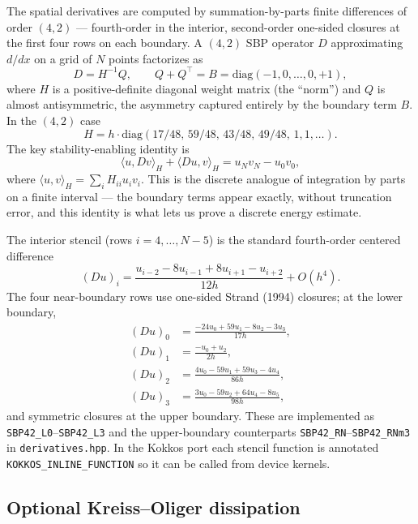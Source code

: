 \documentclass[11pt]{article}
\begin{document}
The spatial derivatives are computed by summation-by-parts
finite differences of order $(4,2)$ --- fourth-order in the
interior, second-order one-sided closures at the first four rows
on each boundary.  A $(4,2)$ SBP operator $D$ approximating
$d/dx$ on a grid of $N$ points factorizes as
\begin{equation}
  D = H^{-1} Q, \qquad
  Q + Q^\top = B = \mathrm{diag}(-1, 0, \ldots, 0, +1),
\end{equation}
where $H$ is a positive-definite diagonal weight matrix (the
``norm'') and $Q$ is almost antisymmetric, the asymmetry captured
entirely by the boundary term $B$.  In the $(4,2)$ case
\begin{equation}
  H = h \cdot \mathrm{diag}(17/48,\, 59/48,\, 43/48,\, 49/48,\,
                            1, 1, \ldots).
\end{equation}
The key stability-enabling identity is
\begin{equation}
  \langle u, D v \rangle_H + \langle Du, v \rangle_H
    = u_N v_N - u_0 v_0,
\end{equation}
where
$\langle u, v \rangle_H = \sum_i H_{ii} u_i v_i$.  This is the
discrete analogue of integration by parts on a finite interval ---
the boundary terms appear exactly, without truncation error, and
this identity is what lets us prove a discrete energy estimate.

The interior stencil (rows $i = 4, \ldots, N-5$) is the standard
fourth-order centered difference
\[
  (D u)_i = \frac{u_{i-2} - 8 u_{i-1} + 8 u_{i+1} - u_{i+2}}{12 h}
  + O(h^4).
\]
The four near-boundary rows use one-sided Strand (1994) closures;
at the lower boundary,
\begin{align*}
  (D u)_0 &= \frac{-24 u_0 + 59 u_1 - 8 u_2 - 3 u_3}{17 h}, \\
  (D u)_1 &= \frac{-u_0 + u_2}{2 h}, \\
  (D u)_2 &= \frac{ 4 u_0 - 59 u_1 + 59 u_3 - 4 u_4}{86 h}, \\
  (D u)_3 &= \frac{ 3 u_0 - 59 u_2 + 64 u_4 - 8 u_5}{98 h},
\end{align*}
and symmetric closures at the upper boundary.  These are
implemented as \texttt{SBP42\_L0}--\texttt{SBP42\_L3} and the
upper-boundary counterparts \texttt{SBP42\_RN}--\texttt{SBP42\_RNm3}
in \texttt{derivatives.hpp}.  In the Kokkos port each stencil
function is annotated \texttt{KOKKOS\_INLINE\_FUNCTION} so it can
be called from device kernels.

\subsection{Optional Kreiss--Oliger dissipation}
\end{document}
